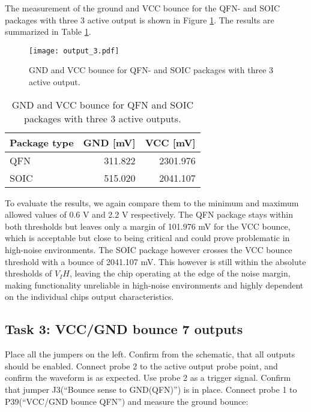 \documentclass[../main.tex]{subfiles}
\begin{document}
\solution

The measurement of the ground and VCC bounce for the QFN- and SOIC packages with three \(\textit{3}\) active output is shown in Figure \ref{fig:gnd_vcc_output_3}. The results are summarized in Table \ref{tab:output_3}.

\begin{figure}[H]
    \centering
    \texttt{[image: output\_3.pdf]}
    \caption{GND and VCC bounce for QFN- and SOIC packages with three \(\textit{3}\) active output.}
    \label{fig:gnd_vcc_output_3}
\end{figure}

\begin{table}[H]
    \centering
    \begin{tabular}{l | r r}
        \toprule[1pt]
        Package type    & GND [mV]  & VCC [mV]\\
        \midrule
        QFN             & 311.822   & 2301.976  \\
        SOIC            & 515.020   & 2041.107  \\
        \bottomrule[1pt]
    \end{tabular}
    \caption{GND and VCC bounce for QFN and SOIC packages with three \(\textit{3}\) active outputs.}
    \label{tab:output_3}
\end{table}

To evaluate the results, we again compare them to the minimum and maximum allowed values of 0.6 V and 2.2 V respectively. The QFN package stays within both thresholds but leaves only a margin of 101.976 mV for the VCC bounce, which is acceptable but close to being critical and could prove problematic in high-noise environments. The SOIC package however crosses the VCC bounce threshold with a bounce of 2041.107 mV. This however is still within the absolute thresholds of $V_IH$, leaving the chip operating at the edge of the noise margin, making functionality unreliable in high-noise environments and highly dependent on the individual chips output characteristics.

\subsection{Task 3: VCC/GND bounce 7 outputs}

Place all the jumpers on the left. Confirm from the schematic, that all outputs should be enabled.
\vspace{10pt}
Connect probe 2 to the active output probe point, and confirm the waveform is as expected. Use probe 2 as a trigger signal.
\vspace{10pt}
Confirm that jumper J3(“Bounce sense to GND(QFN)”) is in place. Connect probe 1 to P39(“VCC/GND bounce QFN”) and measure the ground bounce:
\end{document}
